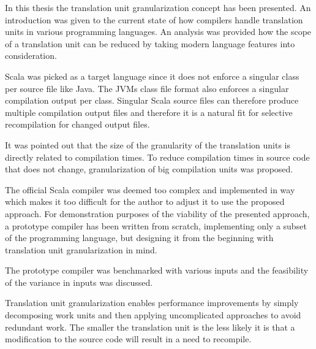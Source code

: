 \documentclass{VUMIFPSbakalaurinis}
\begin{document}

In this thesis the translation unit granularization concept has been presented.
An introduction was given to the current state of how compilers handle translation units in various programming languages.
An analysis was provided how the scope of a translation unit can be reduced by taking modern language features into consideration.

Scala was picked as a target language since it does not enforce a singular class per source file like Java.
The JVMs class file format also enforces a singular compilation output per class.
Singular Scala source files can therefore produce multiple compilation output files and therefore it is a natural fit for selective recompilation for changed output files.

It was pointed out that the size of the granularity of the translation units is directly related to compilation times.
To reduce compilation times in source code that does not change, granularization of big compilation units was proposed.

The official Scala compiler was deemed too complex and implemented in way which makes it too difficult for the author to adjust it to use the proposed approach.
For demonstration purposes of the viability of the presented approach, a prototype compiler has been written from scratch, implementing only a subset of the programming language, but designing it from the beginning with translation unit granularization in mind.

The prototype compiler was benchmarked with various inputs and the feasibility of the variance in inputs was discussed.


Translation unit granularization enables performance improvements by simply decomposing work units and then applying uncomplicated approaches to avoid redundant work.
The smaller the translation unit is the less likely it is that a modification to the source code will result in a need to recompile.
\end{document}
